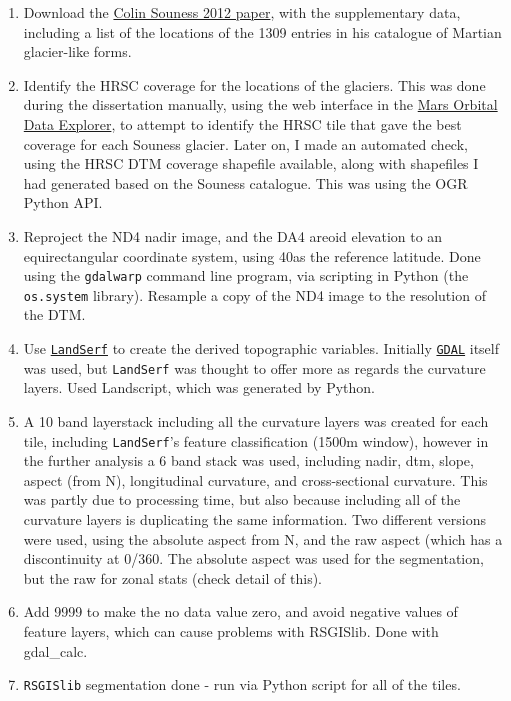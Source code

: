 \documentclass[a4paper,12pt]{article}
\begin{document}
\begin{enumerate}
 \item Download the \href{http://www.sciencedirect.com/science/article/pii/S0019103511004131}{Colin Souness 2012 paper}, with the supplementary data, including
 a list of the locations of the 1309 entries in his catalogue of Martian glacier-like forms. 
 \item Identify the HRSC coverage for the locations of the glaciers. This was done during the dissertation manually, using the web 
 interface in the \href{http://ode.rsl.wustl.edu/mars/}{Mars Orbital Data Explorer}, to attempt to identify the HRSC tile that gave the best coverage
 for each Souness glacier. Later on, I made an automated check, using the HRSC DTM coverage shapefile available, along with shapefiles I had generated based on the Souness catalogue.
 This was using the OGR Python API. 
 \item Reproject the ND4 nadir image, and the DA4 areoid elevation to an equirectangular coordinate system, using
 40\textdegree  as the reference latitude. Done using the {\tt gdalwarp} command line program, via scripting in Python
 (the {\tt os.system} library). Resample a copy of the ND4 image to the resolution of the DTM.
 \item Use \href{http://www.landserf.org/}{{\tt LandSerf}} to create the derived topographic variables. Initially \href{http://gdal.org/}{{\tt GDAL}} itself was used, but
 {\tt LandSerf} was thought to offer more as regards the curvature layers. Used Landscript, which was generated by Python.
\item A 10 band layerstack including all the curvature layers was created for each tile, including {\tt LandSerf}'s feature
 classification (1500m window), however in the further analysis a 6 band stack was used, including nadir, dtm,
 slope, aspect (from N), longitudinal curvature, and cross-sectional curvature. This was partly due to processing time, but also because including all of the curvature layers is duplicating the same information. Two different versions were used,
 using the absolute aspect from N, and the raw aspect (which has a discontinuity at 0/360\textdegree.
 The absolute aspect was used for the segmentation, but the raw for zonal stats (check detail of this).
 \item Add 9999 to make the no data value zero, and avoid negative values of feature layers, which can cause problems with RSGISlib. Done with gdal\_calc.
 \item {\tt RSGISlib} segmentation done - run via Python script for all of the tiles. 

\end{enumerate}
\end{document}
